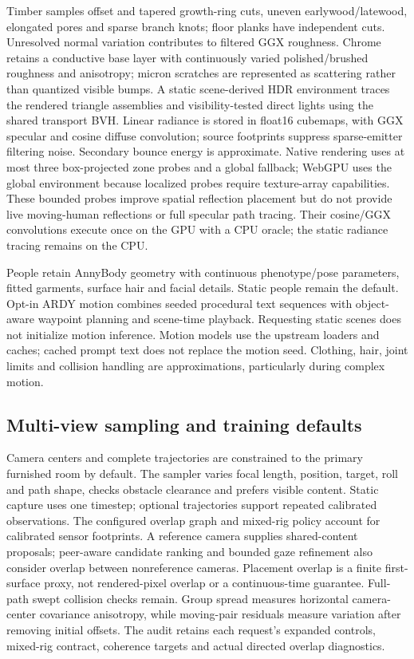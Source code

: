 \documentclass{article}
\begin{document}
Timber samples offset and tapered growth-ring cuts, uneven earlywood/latewood, elongated pores and sparse branch knots; floor planks have independent cuts. Unresolved normal variation contributes to filtered GGX roughness. Chrome retains a conductive base layer with continuously varied polished/brushed roughness and anisotropy; micron scratches are represented as scattering rather than quantized visible bumps. A static scene-derived HDR environment traces the rendered triangle assemblies and visibility-tested direct lights using the shared transport BVH. Linear radiance is stored in float16 cubemaps, with GGX specular and cosine diffuse convolution; source footprints suppress sparse-emitter filtering noise. Secondary bounce energy is approximate. Native rendering uses at most three box-projected zone probes and a global fallback; WebGPU uses the global environment because localized probes require texture-array capabilities. These bounded probes improve spatial reflection placement but do not provide live moving-human reflections or full specular path tracing. Their cosine/GGX convolutions execute once on the GPU with a CPU oracle; the static radiance tracing remains on the CPU.

People retain AnnyBody geometry with continuous phenotype/pose parameters, fitted garments, surface hair and facial details. Static people remain the default. Opt-in ARDY motion combines seeded procedural text sequences with object-aware waypoint planning and scene-time playback. Requesting static scenes does not initialize motion inference. Motion models use the upstream loaders and caches; cached prompt text does not replace the motion seed. Clothing, hair, joint limits and collision handling are approximations, particularly during complex motion.

\subsection{Multi-view sampling and training defaults}
Camera centers and complete trajectories are constrained to the primary furnished room by default. The sampler varies focal length, position, target, roll and path shape, checks obstacle clearance and prefers visible content. Static capture uses one timestep; optional trajectories support repeated calibrated observations. The configured overlap graph and mixed-rig policy account for calibrated sensor footprints. A reference camera supplies shared-content proposals; peer-aware candidate ranking and bounded gaze refinement also consider overlap between nonreference cameras. Placement overlap is a finite first-surface proxy, not rendered-pixel overlap or a continuous-time guarantee. Full-path swept collision checks remain. Group spread measures horizontal camera-center covariance anisotropy, while moving-pair residuals measure variation after removing initial offsets. The audit retains each request's expanded controls, mixed-rig contract, coherence targets and actual directed overlap diagnostics.
\end{document}
